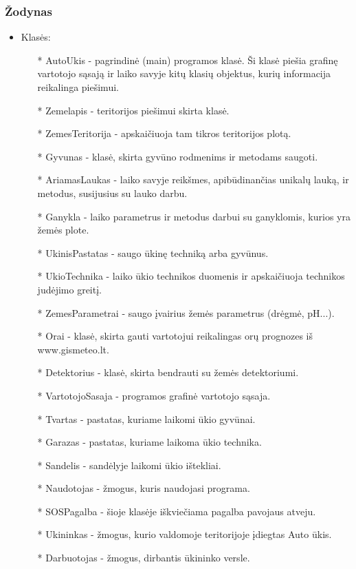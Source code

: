 \documentclass[oneside]{VUMIFPSkursinis}
\begin{document}
\subsubsection{Žodynas}
\begin{itemize}
	\item Klasės:
		\begin{itemize}
			\item[*] AutoUkis - pagrindinė (main) programos klasė. Ši klasė piešia grafinę vartotojo sąsają ir laiko savyje kitų klasių objektus, kurių informacija reikalinga piešimui.
			\item[*] Zemelapis - teritorijos piešimui skirta klasė.
			\item[*] ZemesTeritorija - apskaičiuoja tam tikros teritorijos plotą.
 			\item[*] Gyvunas - klasė, skirta gyvūno rodmenims ir metodams saugoti.
			\item[*] AriamasLaukas - laiko savyje reikšmes, apibūdinančias unikalų lauką, ir metodus, susijusius su lauko darbu.
			\item[*] Ganykla - laiko parametrus ir metodus darbui su ganyklomis, kurios yra žemės plote.
			\item[*] UkinisPastatas - saugo ūkinę techniką arba gyvūnus.
			\item[*] UkioTechnika - laiko ūkio technikos duomenis ir apskaičiuoja technikos judėjimo greitį.
			\item[*] ZemesParametrai - saugo įvairius žemės parametrus (drėgmė, pH...).
			\item[*] Orai - klasė, skirta gauti vartotojui reikalingas orų prognozes iš www.gismeteo.lt.
			\item[*] Detektorius - klasė, skirta bendrauti su žemės detektoriumi.
			\item[*] VartotojoSasaja - programos grafinė vartotojo sąsaja.
			\item[*] Tvartas - pastatas, kuriame laikomi ūkio gyvūnai.
			\item[*] Garazas - pastatas, kuriame laikoma ūkio technika.
			\item[*] Sandelis - sandėlyje laikomi ūkio ištekliai.
			\item[*] Naudotojas - žmogus, kuris naudojasi programa.
			\item[*] SOSPagalba - šioje klasėje iškviečiama pagalba pavojaus atveju.
			\item[*] Ukininkas - žmogus, kurio valdomoje teritorijoje įdiegtas Auto ūkis.
			\item[*] Darbuotojas - žmogus, dirbantis ūkininko versle.

\end{itemize}
\end{itemize}
\end{document}
